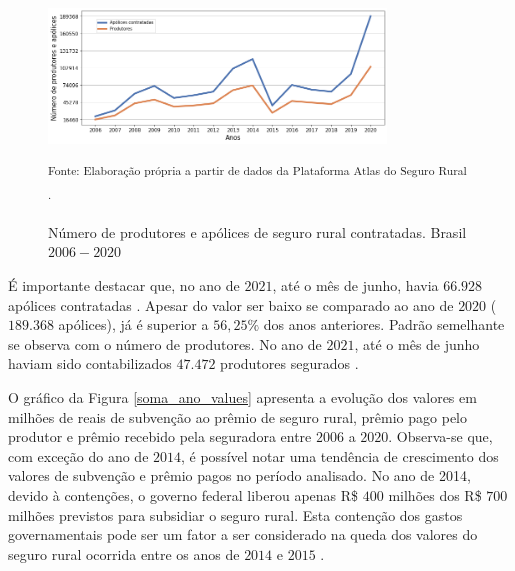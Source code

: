 \begin{figure}[H]
	\centering
	\caption{Número de produtores e apólices de seguro rural contratadas. Brasil $2006 - 2020$}
	\includegraphics[width=0.8\textwidth]{figuras/apolices_produtores.png}\\
    \parbox{\dimexpr\linewidth-3cm}{\raggedright
    \strut \textsuperscript{Fonte: Elaboração própria a partir de dados da Plataforma Atlas do Seguro Rural \cite{brasil21b}.}\strut}
    \label{apolices_produtores}
\end{figure}

É importante destacar que, no ano de $2021$, até o mês de junho, havia $66.928$ apólices contratadas \cite{brasil21}. Apesar do valor ser baixo se comparado ao ano de $2020$ ($189.368$ apólices), já é superior a $56,25\%$ dos anos anteriores. Padrão semelhante se observa com o número de produtores. No ano de $2021$, até o mês de junho haviam sido contabilizados $47.472$ produtores segurados \cite{brasil21b}.


O gráfico da Figura \ref{soma_ano_values} apresenta a evolução dos valores em milhões de reais de subvenção ao prêmio de seguro rural, prêmio pago pelo produtor e prêmio recebido pela seguradora entre $2006$ a $2020$. Observa-se que, com exceção do ano de $2014$, é possível notar uma tendência de crescimento dos valores de subvenção e prêmio pagos no período analisado. No ano de 2014, devido à contenções, o governo federal liberou apenas R\$ $400$ milhões dos R\$ $700$ milhões previstos para subsidiar o seguro rural. Esta contenção dos gastos governamentais pode ser um fator a ser considerado na queda dos valores do seguro rural ocorrida entre os anos de $2014$ e $2015$ \cite{andrade21}.

